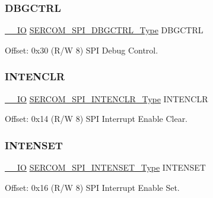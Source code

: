 \mbox{\label{struct_sercom_spi_afba2a830d20ee21ba14a4642fe942135}} 
\subsubsection{\texorpdfstring{DBGCTRL}{DBGCTRL}}
{\footnotesize\ttfamily \mbox{\hyperlink{core__cm0plus_8h_aec43007d9998a0a0e01faede4133d6be}{\+\_\+\+\_\+\+IO}} \mbox{\hyperlink{union_s_e_r_c_o_m___s_p_i___d_b_g_c_t_r_l___type}{S\+E\+R\+C\+O\+M\+\_\+\+S\+P\+I\+\_\+\+D\+B\+G\+C\+T\+R\+L\+\_\+\+Type}} D\+B\+G\+C\+T\+RL}



Offset\+: 0x30 (R/W 8) S\+PI Debug Control. 

\mbox{\label{struct_sercom_spi_ad0704225f5b66d551a059865c2cbec3f}} 
\subsubsection{\texorpdfstring{INTENCLR}{INTENCLR}}
{\footnotesize\ttfamily \mbox{\hyperlink{core__cm0plus_8h_aec43007d9998a0a0e01faede4133d6be}{\+\_\+\+\_\+\+IO}} \mbox{\hyperlink{union_s_e_r_c_o_m___s_p_i___i_n_t_e_n_c_l_r___type}{S\+E\+R\+C\+O\+M\+\_\+\+S\+P\+I\+\_\+\+I\+N\+T\+E\+N\+C\+L\+R\+\_\+\+Type}} I\+N\+T\+E\+N\+C\+LR}



Offset\+: 0x14 (R/W 8) S\+PI Interrupt Enable Clear. 

\mbox{\label{struct_sercom_spi_aa6019ca5b141d15219af0b13b78465a6}} 
\subsubsection{\texorpdfstring{INTENSET}{INTENSET}}
{\footnotesize\ttfamily \mbox{\hyperlink{core__cm0plus_8h_aec43007d9998a0a0e01faede4133d6be}{\+\_\+\+\_\+\+IO}} \mbox{\hyperlink{union_s_e_r_c_o_m___s_p_i___i_n_t_e_n_s_e_t___type}{S\+E\+R\+C\+O\+M\+\_\+\+S\+P\+I\+\_\+\+I\+N\+T\+E\+N\+S\+E\+T\+\_\+\+Type}} I\+N\+T\+E\+N\+S\+ET}



Offset\+: 0x16 (R/W 8) S\+PI Interrupt Enable Set. 

